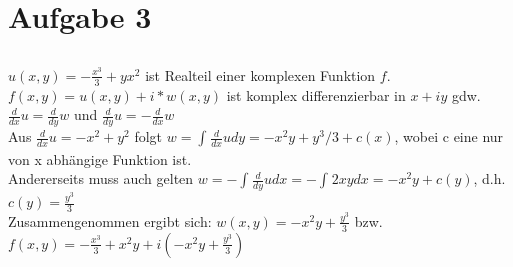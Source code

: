 
	\section{Aufgabe 3}
	
	\subsection{}
	$u(x,y)=-\frac{x^3}{3}+y x^2 $ ist Realteil einer komplexen Funktion $f$.\\
	$f(x,y)=u(x,y)+i*w(x,y)$ ist komplex differenzierbar in $x+iy$ gdw. $\frac{d}{dx}u = \frac{d}{dy}w$ und $\frac{d}{dy}u = -\frac{d}{dx}w$\\
	Aus $\frac{d}{dx}u = -x^2+y^2$ folgt $w=\int_{}{} \frac{d}{dx} u dy =-x^2y+y^3/3+c(x)$, wobei c eine nur von x abhängige Funktion ist.\\
    Andererseits muss auch gelten $w=-\int_{}{} \frac{d}{dy} u dx= -\int_{}{} 2xy  dx =-x^2y+c(y)$, d.h. $c(y)=\frac{y^3}{3}$\\
	Zusammengenommen ergibt sich:
	    $w(x,y)=-x^2y+\frac{y^3}{3}$ bzw. $f(x,y)=-\frac{x^3}{3}+ x^2y +i(-x^2y+\frac{y^3}{3})$